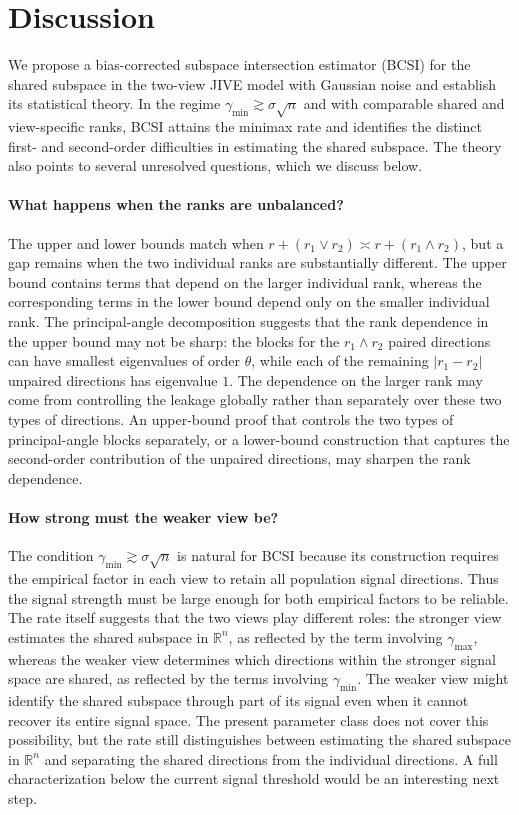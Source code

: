 \documentclass[11pt]{article}
\newcommand{\gmin}{\gamma_{\min}}
\begin{document}
\section{Discussion}
\label{sec:discussion}
We propose a bias-corrected subspace intersection estimator (BCSI) for the shared
subspace in the two-view JIVE model with Gaussian noise and establish its
statistical theory. In the regime $\gmin\gtrsim\sigma\sqrt n$ and with
comparable shared and view-specific ranks, BCSI attains the minimax rate and
identifies the distinct first- and second-order difficulties in estimating the
shared subspace. The theory also points to several unresolved questions, which
we discuss below.


\paragraph{What happens when the ranks are unbalanced?}
The upper and lower bounds match when
$r+(r_1\vee r_2)\asymp r+(r_1\wedge r_2)$,
but a gap remains when the two individual ranks are substantially different.
The upper bound contains terms that depend on the larger individual rank,
whereas the corresponding terms in the lower bound depend only on the smaller
individual rank. The principal-angle decomposition suggests that the rank
dependence in the upper bound may not be sharp: the blocks for the
$r_1\wedge r_2$ paired directions can have smallest eigenvalues of order
$\theta$, while each of the remaining $|r_1-r_2|$ unpaired directions has
eigenvalue $1$. The dependence on the larger rank may come from controlling the
leakage globally rather than separately over these two types of directions. An
upper-bound proof that controls the two types of principal-angle blocks
separately, or a lower-bound construction that captures the second-order
contribution of the unpaired directions, may sharpen the rank dependence.

\paragraph{How strong must the weaker view be?}
The condition $\gamma_{\min}\gtrsim\sigma\sqrt n$ is natural for BCSI because
its construction requires the empirical factor in each view to retain all
population signal directions. Thus the signal strength must be large enough
for both empirical factors to be reliable. The rate itself suggests that the
two views play different roles: the stronger view estimates the shared subspace
in $\mathbb R^n$, as reflected by the term involving $\gamma_{\max}$, whereas
the weaker view determines which directions within the stronger signal space
are shared, as reflected by the terms involving $\gamma_{\min}$. The weaker
view might identify the shared subspace through part of its signal even when it
cannot recover its entire signal space. The present parameter class does not
cover this possibility, but the rate still distinguishes between estimating the
shared subspace in $\mathbb R^n$ and separating the shared directions from the
individual directions. A full characterization below the current signal
threshold would be an interesting next step.
\end{document}
